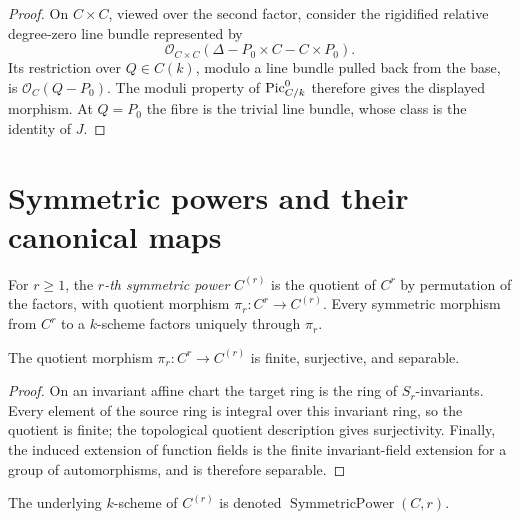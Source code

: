 \begin{proof}
  On \(C\times C\), viewed over the second factor, consider the
  rigidified relative degree-zero line bundle represented by
  \[
    \mathcal O_{C\times C}
      (\Delta-P_0\times C-C\times P_0).
  \]
  Its restriction over \(Q\in C(k)\), modulo a line bundle pulled back
  from the base, is \(\mathcal O_C(Q-P_0)\).  The moduli property of
  \(\operatorname{Pic}^0_{C/k}\) therefore gives the displayed morphism.  At \(Q=P_0\)
  the fibre is the trivial line bundle, whose class is the identity of
  \(J\).
\end{proof}

\section{Symmetric powers and their canonical maps}
\label{mk-sec:albaneseup_symmetric_powers}

\begin{definition}
  \label{mk-def:symmetric_power_curve}

  For \(r\ge 1\), the \emph{\(r\)-th symmetric power} \(C^{(r)}\) is the
  quotient of \(C^r\) by permutation of the factors, with quotient morphism
  \(\pi_r\colon C^r\to C^{(r)}\).  Every symmetric morphism from \(C^r\) to a
  \(k\)-scheme factors uniquely through \(\pi_r\).
\end{definition}

\begin{lemma}
  \label{mk-lem:symmetric_power_projection_properties}

  The quotient morphism \(\pi_r\colon C^r\to C^{(r)}\) is finite,
  surjective, and separable.
\end{lemma}

\begin{proof}
  On an invariant affine chart the target ring is the ring of
  \(S_r\)-invariants.  Every element of the source ring is integral over this
  invariant ring, so the quotient is finite; the topological quotient
  description gives surjectivity.  Finally, the induced extension of
  function fields is the finite invariant-field extension for a group of
  automorphisms, and is therefore separable.
\end{proof}

\begin{definition}
  \label{mk-def:symmetric_power_curve_carrier}


  The underlying \(k\)-scheme of \(C^{(r)}\) is denoted
  \(\operatorname{SymmetricPower}(C,r)\).
\end{definition}

